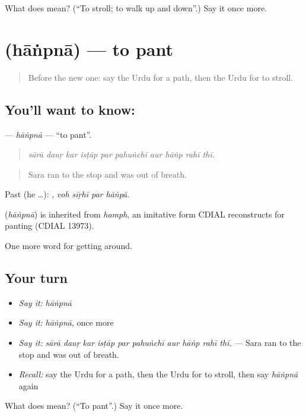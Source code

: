 \begin{tcolorbox}[breakable,colback=teal!4,colframe=teal!35!black,title={Before you move on}]
What does  mean? (\textquotedblleft{}To stroll; to walk up and down\textquotedblright{}.) Say it once more.
\end{tcolorbox}
\section[\texorpdfstring{\ur{ہانپنا} (hāṅpnā)}{ہانپنا (hāṅpnā)}]{ (hāṅpnā) — to pant}

\label{lesson:UR-C392-hanpna}



\begin{quote}
Before the new one: say the Urdu for a path, then the Urdu for to stroll.
\end{quote}

\subsection*{You'll want to know: }
\textbf{} — \emph{hāṅpnā} — \textquotedblleft{}to pant\textquotedblright{}.

\begin{quote}
         
\end{quote}

\begin{quote}
\emph{sārā dauṛ kar isṭāp par pahuṅchī aur hāṅp rahī thī.}
\end{quote}

\begin{quote}
Sara ran to the stop and was out of breath.
\end{quote}

Past (he …):    , \emph{voh sīṛhī par hāṅpā}.

\begin{cousinweb}
\textbf{} (\emph{hāṅpnā}) is inherited from \emph{hamph}, an imitative form CDIAL reconstructs for panting (CDIAL 13973).
\end{cousinweb}

\begin{grammarlens}[title={What you've built}]
One more word for getting around.
\end{grammarlens}

\subsection*{Your turn}
\begin{itemize}
\raggedright
  \item \emph{Say it:} \emph{hāṅpnā}
  \item \emph{Say it:} \emph{hāṅpnā}, once more
  \item \emph{Say it:} \emph{sārā dauṛ kar isṭāp par pahuṅchī aur hāṅp rahī thī.} — Sara ran to the stop and was out of breath.
  \item \emph{Recall:} say the Urdu for a path, then the Urdu for to stroll, then say \emph{hāṅpnā} again
\end{itemize}

\begin{tcolorbox}[breakable,colback=teal!4,colframe=teal!35!black,title={Before you move on}]
What does  mean? (\textquotedblleft{}To pant\textquotedblright{}.) Say it once more.
\end{tcolorbox}
